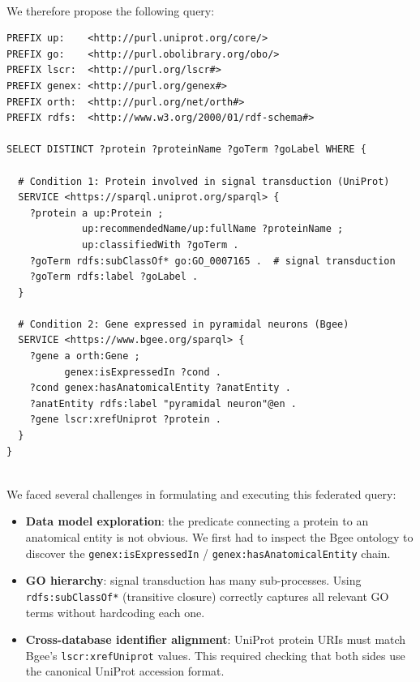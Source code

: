 \documentclass[12pt,a4paper]{article}
\begin{document}
\text{ }\\
We therefore propose the following query:  
\begin{lstlisting}[caption={Federated SPARQL query joining UniProt and Bgee.},
                   label={lst:q1}]
PREFIX up:    <http://purl.uniprot.org/core/>
PREFIX go:    <http://purl.obolibrary.org/obo/>
PREFIX lscr:  <http://purl.org/lscr#>
PREFIX genex: <http://purl.org/genex#>
PREFIX orth:  <http://purl.org/net/orth#>
PREFIX rdfs:  <http://www.w3.org/2000/01/rdf-schema#>

SELECT DISTINCT ?protein ?proteinName ?goTerm ?goLabel WHERE {

  # Condition 1: Protein involved in signal transduction (UniProt)
  SERVICE <https://sparql.uniprot.org/sparql> {
    ?protein a up:Protein ;
             up:recommendedName/up:fullName ?proteinName ;
             up:classifiedWith ?goTerm .
    ?goTerm rdfs:subClassOf* go:GO_0007165 .  # signal transduction
    ?goTerm rdfs:label ?goLabel .
  }

  # Condition 2: Gene expressed in pyramidal neurons (Bgee)
  SERVICE <https://www.bgee.org/sparql> {
    ?gene a orth:Gene ;
          genex:isExpressedIn ?cond .
    ?cond genex:hasAnatomicalEntity ?anatEntity .
    ?anatEntity rdfs:label "pyramidal neuron"@en .
    ?gene lscr:xrefUniprot ?protein .
  }
}
\end{lstlisting}

\text{ }\\
We faced several challenges in formulating and executing this federated query:
\begin{itemize}
  \item \textbf{Data model exploration}: the predicate connecting a protein to
        an anatomical entity is not obvious. We first had to inspect the Bgee
        ontology to discover the \texttt{genex:isExpressedIn} / 
        \texttt{genex:hasAnatomicalEntity} chain.
  \item \textbf{GO hierarchy}: signal transduction has many sub-processes.
        Using \texttt{rdfs:subClassOf*} (transitive closure) correctly captures
        all relevant GO terms without hardcoding each one.
  \item \textbf{Cross-database identifier alignment}: UniProt protein URIs must
        match Bgee's \texttt{lscr:xrefUniprot} values. This required checking
        that both sides use the canonical UniProt accession format.
\end{itemize}

\newpage
\end{document}
